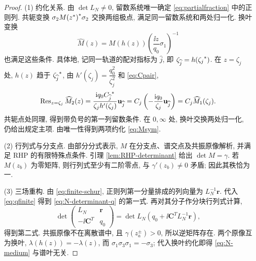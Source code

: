 \begin{proof}
(1) 约化关系. 由 $\det L_N\ne0$, 留数系统唯一确定 \eqref{eq:partialfraction} 中的正则列.
共轭变换 $\sigma_2{M({z}^{*})}^{*}\sigma_2$ 交换两组极点, 满足同一留数系统和两处归一化. 换叶变换
\begin{equation*}
\widehat M(z)=M(h(z))\left(\dfrac{\ii z}{q_0}\sigma_1\right)^{-1}
\end{equation*}
也满足这些条件. 具体地, 记同一轨道的配对指标为 $\widehat j$, 即 $\zeta_{\widehat j}=h({\zeta_j}^{*})$. 在 $z=\zeta_j$ 处, $h(z)$ 趋于 ${\zeta_{\widehat j}}^{*}$, 由 $h'(\zeta_j)=\dfrac{q_0^2}{\zeta_j^2}$ 和 \eqref{eq:Cpair},
\begin{equation*}
\operatorname{Res}_{z=\zeta_j}\widehat M_2(z)
=\dfrac{\mathrm{i} q_0{C_{\widehat j}}^{*}}{\zeta_jh'(\zeta_j)}\mathbf u_{\widehat j}
=C_j\left(-\dfrac{\mathrm{i} q_0}{\zeta_j}\mathbf u_{\widehat j}\right)
=C_j\widehat M_1(\zeta_j).
\end{equation*}
共轭点处同理, 得到带负号的第一列留数条件. 在 $0,\infty$ 处, 换叶交换两处归一化, 仍给出规定主项. 由唯一性得到两项约化 \eqref{eq:Msym}.

(2) 行列式与分支点. 由部分分式表示, $M$ 在分支点、谱交点及共振原像解析, 并满足 RHP 的有限特殊点条件.
引理 \ref{lem:RHP-determinant} 给出 $\det M=\gamma$.
若 $M(z_b)$ 为零矩阵, 则行列式至少有二阶零点, 与 $\gamma'(z_b)\ne0$ 矛盾; 因此其秩恰为一.

(3) 三场重构. 由 \eqref{eq:finite-schur}, 正则列第一分量排成的列向量为 $L_N^{-1}\boldsymbol r$. 代入 \eqref{eq:qfinite} 得到 \eqref{eq:N-determinant-q} 的第一式. 再对其分子作分块行列式计算,
\begin{equation*}
\det\begin{pmatrix}L_N&\boldsymbol r\\-\ii\boldsymbol C^T&q_0\end{pmatrix}
=\det L_N\left(q_0+\ii\boldsymbol C^T L_N^{-1}\boldsymbol r\right),
\end{equation*}
得到第二式. 共振原像不在离散谱中, 且 $\gamma(z_a^\pm)>0$, 所以逆矩阵存在. 两个原像互为换叶, $\lambda(h(z))=-\lambda(z)$, 而 $\sigma_1\sigma_3\sigma_1=-\sigma_3$; 代入换叶约化即得 \eqref{eq:N-medium} 与谱叶无关.
\end{proof}

